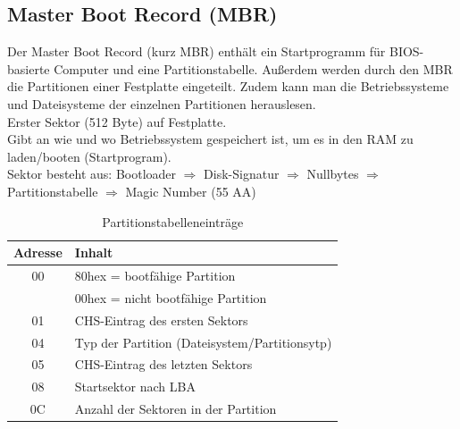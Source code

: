 \documentclass[12pt,a4paper]{article}
\begin{document}
	\subsection{Master Boot Record (MBR)}
		Der Master Boot Record (kurz MBR) enthält ein Startprogramm für BIOS-basierte Computer und eine Partitionstabelle.
		Außerdem werden durch den MBR die Partitionen einer Festplatte eingeteilt. Zudem kann man die Betriebssysteme und Dateisysteme der einzelnen Partitionen herauslesen.\\
		Erster Sektor (512 Byte) auf Festplatte. \\
		Gibt an wie und wo Betriebssystem gespeichert ist, um es in den RAM zu laden/booten (Startprogram).\\
		Sektor besteht aus: Bootloader $\Rightarrow$ Disk-Signatur $\Rightarrow$ Nullbytes $\Rightarrow$ Partitionstabelle $\Rightarrow$ Magic Number (55 AA)
		\begin{table}[h]
			\renewcommand{\arraystretch}{1.5}
			\caption{Partitionstabelleneinträge}
			\vspace{.2cm}
			\begin{tabularx}{\columnwidth}{|c|X|}
				\hline
				\cellcolor{cyan!60!white}Adresse&\cellcolor{cyan!60!white}Inhalt \\
				\hline
				00&80hex = bootfähige Partition \\
				&00hex = nicht bootfähige Partition \\
				\hline
				01&CHS-Eintrag des ersten Sektors \\
				\hline
				04&Typ der Partition (Dateisystem/Partitionsytp) \\
				\hline
				05&CHS-Eintrag des letzten Sektors \\
				\hline
				08&Startsektor nach LBA\\
				\hline
				0C&Anzahl der Sektoren in der Partition \\
				\hline
			\end{tabularx}
		\end{table}
\end{document}
